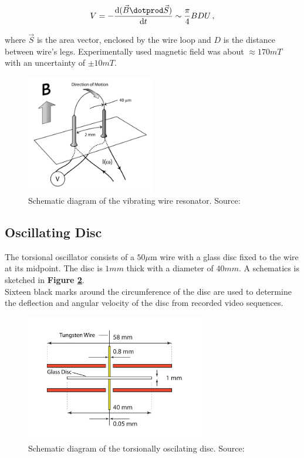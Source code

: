 \begin{equation}
V = - \frac{\text{d} (\vec{B} \dotprod \vec{S})}{\text{d} t}
\sim \frac{\pi}{4} BDU\,,
\end{equation}

where $\vec{S}$ is the area vector, enclosed by the wire loop and $D$ is the distance between wire's legs. Experimentally used magnetic field was about $\approx 170 \unit{mT}$ with an uncertainty of $\pm 10 \unit{mT}$.

\begin{figure}[h]
	\centering
	\includegraphics[width=0.5\textwidth]{graphics/exp/wire}
	\caption{Schematic diagram of the vibrating wire resonator. Source: \cite{universal_scaling}}
	\label{wire}
\end{figure}

\newpage

\subsection{Oscillating Disc}

The torsional oscillator consists of a $50 \mu\text{m}$ wire  with a glass disc fixed to
the wire at its midpoint. The disc is $1\unit{mm}$ thick with a diameter of $40\unit{mm}$. A schematics is sketched in \textbf{Figure \ref{disc}}.\\
Sixteen black marks around the circumference of the disc are used to determine the deflection and angular velocity of the disc from recorded video sequences.

\begin{figure}[h]
	\centering
	\includegraphics[width=0.7\textwidth]{graphics/exp/disc}
	\caption{Schematic diagram of the torsionally oscilating disc. Source: \cite{universal_scaling}}
	\label{disc}
\end{figure}

